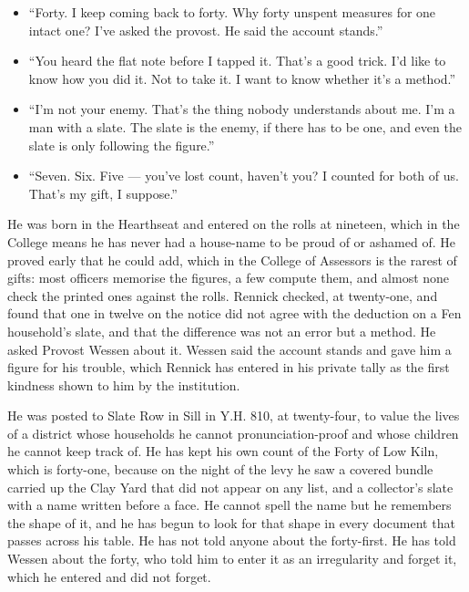 \documentclass{design/chronicle}
\begin{document}
{\begin{itemize}[leftmargin=1.4em,itemsep=1pt,topsep=3pt,parsep=0pt]
\item “Forty. I keep coming back to forty. Why forty unspent measures for one intact one? I’ve asked the provost. He said the account stands.”

\item “You heard the flat note before I tapped it. That’s a good trick. I’d like to know how you did it. Not to take it. I want to know whether it’s a method.”

\item “I’m not your enemy. That’s the thing nobody understands about me. I’m a man with a slate. The slate is the enemy, if there has to be one, and even the slate is only following the figure.”

\item “Seven. Six. Five — you’ve lost count, haven’t you? I counted for both of us. That’s my gift, I suppose.”

\end{itemize}

He was born in the Hearthseat and entered on the rolls at nineteen, which in the College means he has never had a house-name to be proud of or ashamed of. He proved early that he could add, which in the College of Assessors is the rarest of gifts: most officers memorise the figures, a few compute them, and almost none check the printed ones against the rolls. Rennick checked, at twenty-one, and found that one in twelve on the notice did not agree with the deduction on a Fen household’s slate, and that the difference was not an error but a method. He asked Provost Wessen about it. Wessen said the account stands and gave him a figure for his trouble, which Rennick has entered in his private tally as the first kindness shown to him by the institution.

He was posted to Slate Row in Sill in Y.H. 810, at twenty-four, to value the lives of a district whose households he cannot pronunciation-proof and whose children he cannot keep track of. He has kept his own count of the Forty of Low Kiln, which is forty-one, because on the night of the levy he saw a covered bundle carried up the Clay Yard that did not appear on any list, and a collector’s slate with a name written before a face. He cannot spell the name but he remembers the shape of it, and he has begun to look for that shape in every document that passes across his table. He has not told anyone about the forty-first. He has told Wessen about the forty, who told him to enter it as an irregularity and forget it, which he entered and did not forget.

}
\end{document}

